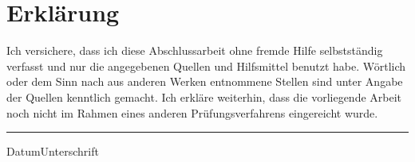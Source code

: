 \chapter*{Erklärung}
Ich  versichere, dass  ich diese  Abschlussarbeit ohne  fremde  Hilfe selbstständig
verfasst und  nur die  angegebenen Quellen und  Hilfsmittel benutzt  habe. Wörtlich
oder dem  Sinn nach  aus anderen  Werken entnommene Stellen  sind unter  Angabe der
Quellen kenntlich gemacht.
Ich erkläre weiterhin, dass die vorliegende Arbeit noch nicht im Rahmen eines anderen Prüfungsverfahrens eingereicht wurde.
\vspace{10ex}\\
\hrule
{\small{Datum}}\hfill{\small{Unterschrift}}